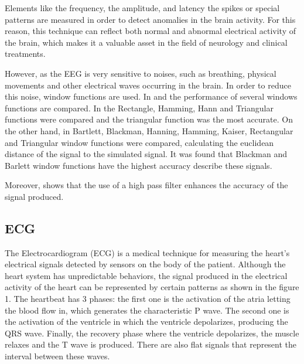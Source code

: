 Elements like the frequency, the amplitude, and latency the spikes or special patterns  are measured  in order to detect anomalies in the brain activity. For this reason, this technique can reflect both normal and abnormal electrical activity of the brain, which makes it a valuable asset in the field of neurology and clinical treatments. 

However, as the EEG is very sensitive to noises, such as breathing, physical movements and other electrical waves occurring in the brain. In order to reduce this noise, window functions are used. In \cite{EEGwindowfunc1} and \cite{EEGwindowfunc3} the performance of several windows functions are compared. In \cite{EEGwindowfunc1} the Rectangle, Hamming, Hann and Triangular functions were compared and the triangular function was the most accurate. On the other hand, in \cite{EEGwindowfunc2} Bartlett, Blackman, Hanning, Hamming, Kaiser, Rectangular and Triangular window functions were compared, calculating the euclidean distance of the signal to the simulated signal. It was found that Blackman and Barlett window functions have the highest accuracy describe these signals.

Moreover, \cite{EEGwindowfunc1} shows that the use of a high pass filter enhances the accuracy of the signal produced.

\subsection{ECG}
The Electrocardiogram (ECG) is a medical technique for measuring the heart's electrical signals detected by sensors on the body of the patient. Although the heart system has unpredictable behaviors, the signal produced in the electrical activity of the heart can be represented by certain patterns  as shown in the figure 1. The heartbeat has 3 phases: the first one is the activation of the atria letting the blood flow in, which generates the characteristic P wave. The second one is the activation of the ventricle in which the ventricle depolarizes, producing the QRS wave. Finally, the recovery phase where the ventricle depolarizes, the muscle relaxes  and the T wave is produced. There are also flat signals that represent the interval between these waves. 

